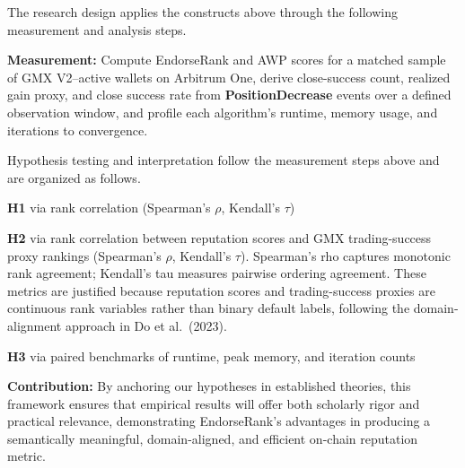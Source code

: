 The research design applies the constructs above through the following measurement and analysis steps.

\textbf{Measurement: }Compute EndorseRank and AWP scores for a matched sample of GMX V2--active wallets on Arbitrum One, derive close-success count, realized gain proxy, and close success rate from \textbf{PositionDecrease} events over a defined observation window, and profile each algorithm's runtime, memory usage, and iterations to convergence.


Hypothesis testing and interpretation follow the measurement steps above and are organized as follows.



\textbf{H1 }via rank correlation (Spearman's \emph{\(\rho\)}, Kendall's \emph{\(\tau\)})


\textbf{H2 }via rank correlation between reputation scores and GMX trading-success proxy rankings (Spearman's \emph{\(\rho\)}, Kendall's \emph{\(\tau\)}). Spearman's rho captures monotonic rank agreement; Kendall's tau measures pairwise ordering agreement. These metrics are justified because reputation scores and trading-success proxies are continuous rank variables rather than binary default labels, following the domain-alignment approach in Do et al.\ (2023).


\textbf{H3 }via paired benchmarks of runtime, peak memory, and iteration counts


\textbf{Contribution: }By anchoring our hypotheses in established theories, this framework ensures that empirical results will offer both scholarly rigor and practical relevance, demonstrating EndorseRank's advantages in producing a semantically meaningful, domain-aligned, and efficient on-chain reputation metric.
